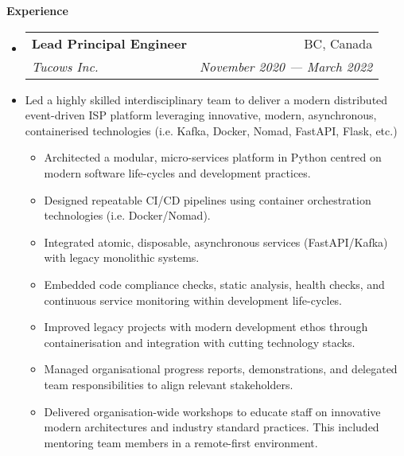 \documentclass[letterpaper,11pt]{article}
\makeatletter
\newlength{\headinglength}
\newcommand{\resheading}[1]{{\large \colorbox{mygrey}
        {\begin{minipage}{\headinglength}
            {\textbf{#1 \vphantom{p\^{E}}}}
        \end{minipage}}}}
\newcommand{\ressubheading}[4]
    {\begin{tabular*}{180mm}{l@{\extracolsep{\fill}}r}
        \textbf{#1} & #2 \\
        \textit{#3} & \textit{#4} \\
    \end{tabular*}\vspace{-6pt}}
\newcommand{\resdescription}[1]{#1 \vspace{-0mm}}
\newcommand{\resitem}[1]{\item #1 \vspace{-2pt}}
\makeatother
\begin{document}
    \resheading{Experience}
    \begin{itemize}
        \item[]
            \ressubheading{Lead Principal Engineer}{BC, Canada}{Tucows Inc.}{November 2020 --- March 2022}
        \item[]
            \resdescription{Led a highly skilled interdisciplinary team to deliver a modern distributed event-driven ISP platform leveraging innovative, modern, asynchronous, containerised technologies (i.e. Kafka, Docker, Nomad, FastAPI, Flask, etc.)}
            \begin{itemize}
                    \resitem{Architected a modular, micro-services platform in Python centred on modern software life-cycles and development practices.}
                    \resitem{Designed repeatable CI/CD pipelines using container orchestration technologies (i.e. Docker/Nomad).}
                    \resitem{Integrated atomic, disposable, asynchronous services (FastAPI/Kafka) with legacy monolithic systems.}
                    \resitem{Embedded code compliance checks, static analysis, health checks, and continuous service monitoring within development life-cycles.}
                    \resitem{Improved legacy projects with modern development ethos through containerisation and integration with cutting technology stacks.}
                    \resitem{Managed organisational progress reports, demonstrations, and delegated team responsibilities to align relevant stakeholders.}
                    \resitem{Delivered organisation-wide workshops to educate staff on innovative modern architectures and industry standard practices. This included mentoring team members in a remote-first environment.}
            \end{itemize}


\end{itemize}
\end{document}
